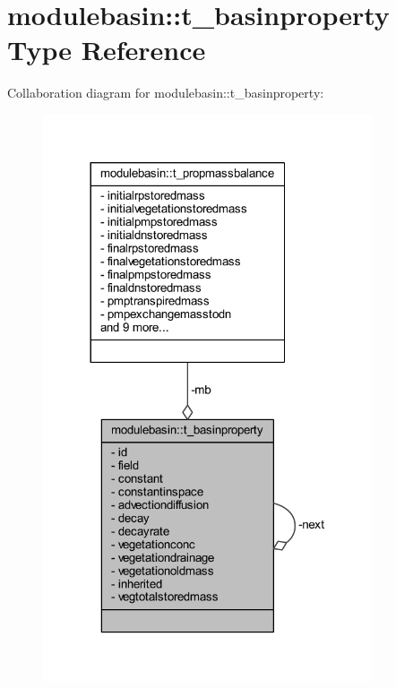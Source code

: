 \hypertarget{structmodulebasin_1_1t__basinproperty}{}\section{modulebasin\+:\+:t\+\_\+basinproperty Type Reference}
\label{structmodulebasin_1_1t__basinproperty}


Collaboration diagram for modulebasin\+:\+:t\+\_\+basinproperty\+:\nopagebreak
\begin{figure}[H]
\begin{center}
\leavevmode
\includegraphics[width=276pt]{structmodulebasin_1_1t__basinproperty__coll__graph}
\end{center}
\end{figure}
